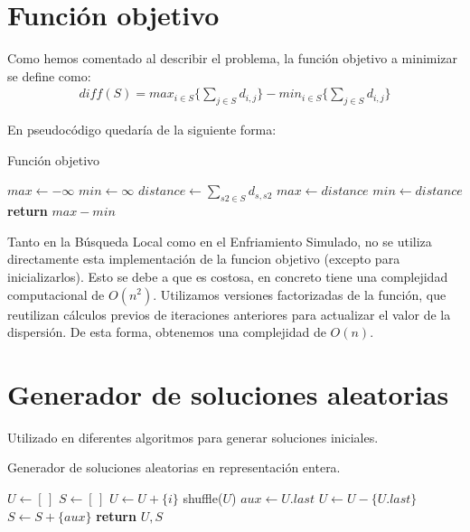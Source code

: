 \section{Función objetivo}

Como hemos comentado al describir el problema, la función objetivo a minimizar se define como:
\begin{align*}
    diff(S) = max_{i \in S} \{ \sum_{j \in S} d_{i,j}\} - min_{i \in S} \{ \sum_{j \in S} d_{i,j}\}
\end{align*}

\noindent En pseudocódigo quedaría de la siguiente forma:
\begin{algorithm}
    \caption{Función objetivo}
\begin{algorithmic}
\State $max \gets -\infty$
\State $min \gets \infty$
    \State $distance \gets \sum_{s2 \in S} d_{s,s2}$
        \State $max \gets distance$
    \EndIf
        \State $min \gets distance$
    \EndIf
\EndFor
\State \textbf{return} $max - min$
\end{algorithmic}
\end{algorithm}

Tanto en la Búsqueda Local como en el Enfriamiento Simulado, no se utiliza directamente esta implementación de la funcion objetivo (excepto para inicializarlos). Esto se debe a que es costosa, en concreto tiene una complejidad computacional de $O(n^2)$. Utilizamos versiones factorizadas de la función, que reutilizan cálculos previos de iteraciones anteriores para actualizar el valor de la dispersión. De esta forma, obtenemos una complejidad de $O(n)$.

\newpage
\section{Generador de soluciones aleatorias}
Utilizado en diferentes algoritmos para generar soluciones iniciales.

\begin{algorithm}[H]
    \caption{Generador de soluciones aleatorias en representación entera.}
\begin{algorithmic}[1]
    \State $U \leftarrow [ \, ]$
    \State $S \leftarrow [ \, ]$
    \State
        \State $U \leftarrow U + \{i\}$
    \EndFor
    \State
    \State shuffle($U$)
        \State $aux \leftarrow U.last$
        \State $U \leftarrow U - \{U.last\}$
        \State $S \leftarrow S + \{aux\}$
    \EndFor
    \State
    \State \textbf{return} $U, S$
\EndProcedure
\end{algorithmic}
\end{algorithm}



